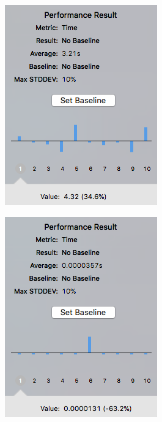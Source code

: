 \begin{figure}[h]
\centering
\begin{minipage}{.5\textwidth}
  \centering
  \includegraphics[width=.65\linewidth]{inc/img/perf/rsakeygen.png}
  \label{sec:eng:performance:rsakeygen:result}
\end{minipage}%
\begin{minipage}{.5\textwidth}
  \centering
  \includegraphics[width=.65\linewidth]{inc/img/perf/aeskeygen.png}
  \label{sec:eng:performance:aeskeygen:result}
\end{minipage}
\end{figure}